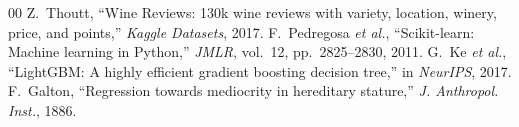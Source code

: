 \documentclass[conference]{IEEEtran}
\begin{document}

\begin{thebibliography}{00}
 Z.~Thoutt, ``Wine Reviews: 130k wine reviews with variety, location, winery, price, and points,'' \textit{Kaggle Datasets}, 2017.
 F.~Pedregosa \textit{et al.}, ``Scikit-learn: Machine learning in Python,'' \textit{JMLR}, vol.~12, pp.~2825--2830, 2011.
 G.~Ke \textit{et al.}, ``LightGBM: A highly efficient gradient boosting decision tree,'' in \textit{NeurIPS}, 2017.
 F.~Galton, ``Regression towards mediocrity in hereditary stature,'' \textit{J. Anthropol. Inst.}, 1886.
\end{thebibliography}
\end{document}
